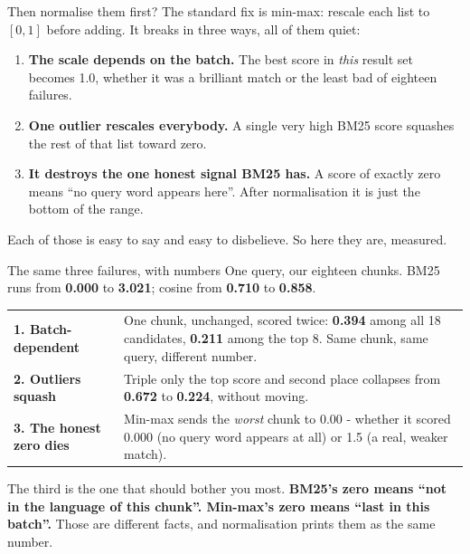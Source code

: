 \documentclass[aspectratio=169]{beamer}
\newcommand{\keybox}[1]{%
  \begin{tcolorbox}[colback=armblue!8, colframe=armblue, boxrule=0.6pt, arc=2pt]
  #1
  \end{tcolorbox}}
\newcommand{\trapbox}[1]{%
  \begin{tcolorbox}[colback=armred!8, colframe=armred, boxrule=0.6pt, arc=2pt]
  #1
  \end{tcolorbox}}
\begin{document}
\begin{frame}{Then normalise them first?}
  \vspace{0.6em}
  The standard fix is min-max: rescale each list to $[0, 1]$ before adding. It breaks in
  three ways, all of them quiet:

  \vspace{0.7em}
  \begin{enumerate}
    \item[\textbf{1.}] \textbf{The scale depends on the batch.} The best score in
      \emph{this} result set becomes 1.0, whether it was a brilliant match or the least bad
      of eighteen failures.
    \item[\textbf{2.}] \textbf{One outlier rescales everybody.} A single very high BM25
      score squashes the rest of that list toward zero.
    \item[\textbf{3.}] \textbf{It destroys the one honest signal BM25 has.} A score of
      exactly zero means ``no query word appears here''. After normalisation it is just the
      bottom of the range.
  \end{enumerate}

  \vspace{0.9em}
  \keybox{Each of those is easy to say and easy to disbelieve. So here they are, measured.}
\end{frame}

\begin{frame}{The same three failures, with numbers}
  \vspace{0.2em}
  One query, our eighteen chunks. BM25 runs from \textbf{0.000} to \textbf{3.021}; cosine
  from \textbf{0.710} to \textbf{0.858}.

  \vspace{0.1em}
  \begin{center}
  \small
  \begin{tabular}{p{}p{}}
    \toprule
    \textbf{1. Batch-dependent} &
    One chunk, unchanged, scored twice: \textbf{0.394} among all 18 candidates,
    \textbf{0.211} among the top 8. Same chunk, same query, different number. \\[0.2em]
    \textbf{2. Outliers squash} &
    Triple only the top score and second place collapses from \textbf{0.672} to
    \textbf{0.224}, without moving. \\[0.2em]
    \textbf{3. The honest zero dies} &
    Min-max sends the \emph{worst} chunk to 0.00 - whether it scored 0.000 (no query word
    appears at all) or 1.5 (a real, weaker match). \\
    \bottomrule
  \end{tabular}
  \end{center}

  \vspace{0.1em}
  \trapbox{The third is the one that should bother you most. \textbf{BM25's zero means ``not
  in the language of this chunk''. Min-max's zero means ``last in this batch''.} Those are
  different facts, and normalisation prints them as the same number.}
\end{frame}
\end{document}
